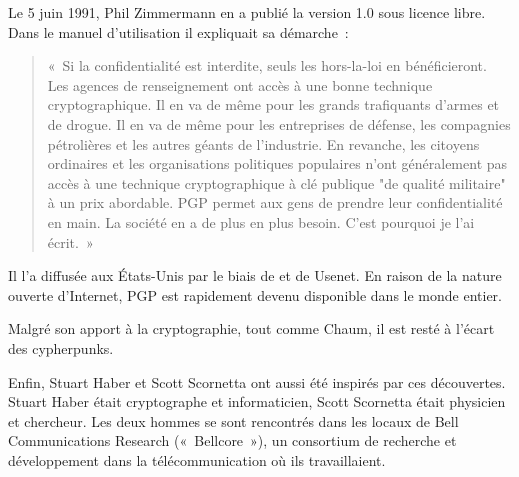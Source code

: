 Le 5 juin 1991, Phil Zimmermann en a publié la version 1.0 sous licence libre. Dans le manuel d'utilisation il expliquait sa démarche~:

\begin{quote}
«~Si la confidentialité est interdite, seuls les hors-la-loi en bénéficieront. Les agences de renseignement ont accès à une bonne technique cryptographique. Il en va de même pour les grands trafiquants d'armes et de drogue. Il en va de même pour les entreprises de défense, les compagnies pétrolières et les autres géants de l'industrie. En revanche, les citoyens ordinaires et les organisations politiques populaires n'ont généralement pas accès à une technique cryptographique à clé publique "de qualité militaire" à un prix abordable. PGP permet aux gens de prendre leur confidentialité en main. La société en a de plus en plus besoin. C'est pourquoi je l'ai écrit.~»
\end{quote} %


Il l'a diffusée aux États-Unis par le biais de  et de Usenet. En raison de la nature ouverte d'Internet, PGP est rapidement devenu disponible dans le monde entier.

Malgré son apport à la cryptographie, tout comme Chaum, il est resté à l'écart des cypherpunks.

Enfin, Stuart Haber et Scott Scornetta ont aussi été inspirés par ces découvertes. Stuart Haber était cryptographe et informaticien, Scott Scornetta était physicien et chercheur. Les deux hommes se sont rencontrés dans les locaux de Bell Communications Research («~Bellcore~»), un consortium de recherche et développement dans la télécommunication où ils travaillaient.

